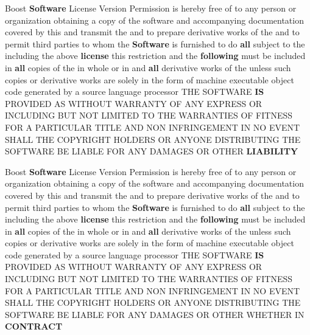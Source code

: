 \begin{DoxyCompactItemize}
\item 
Boost {\bf Software} License Version Permission is hereby free of to any person or organization obtaining a copy of the software and accompanying documentation covered by this and transmit the and to prepare derivative works of the and to permit third parties to whom the {\bf Software} is furnished to do {\bf all} subject to the including the above {\bf license} this restriction and the {\bf following} must be included in {\bf all} copies of the in whole or in and {\bf all} derivative works of the unless such copies or derivative works are solely in the form of machine executable object code generated by a source language processor T\+HE S\+O\+F\+T\+W\+A\+RE {\bf IS} P\+R\+O\+V\+I\+D\+ED AS W\+I\+T\+H\+O\+UT W\+A\+R\+R\+A\+N\+TY OF A\+NY E\+X\+P\+R\+E\+SS OR I\+N\+C\+L\+U\+D\+I\+NG B\+UT N\+OT L\+I\+M\+I\+T\+ED TO T\+HE W\+A\+R\+R\+A\+N\+T\+I\+ES OF F\+I\+T\+N\+E\+SS F\+OR A P\+A\+R\+T\+I\+C\+U\+L\+AR T\+I\+T\+LE A\+ND N\+ON I\+N\+F\+R\+I\+N\+G\+E\+M\+E\+NT IN NO E\+V\+E\+NT S\+H\+A\+LL T\+HE C\+O\+P\+Y\+R\+I\+G\+HT H\+O\+L\+D\+E\+RS OR A\+N\+Y\+O\+NE D\+I\+S\+T\+R\+I\+B\+U\+T\+I\+NG T\+HE S\+O\+F\+T\+W\+A\+RE BE L\+I\+A\+B\+LE F\+OR A\+NY D\+A\+M\+A\+G\+ES OR O\+T\+H\+ER {\bf L\+I\+A\+B\+I\+L\+I\+TY}
\item 
Boost {\bf Software} License Version Permission is hereby free of to any person or organization obtaining a copy of the software and accompanying documentation covered by this and transmit the and to prepare derivative works of the and to permit third parties to whom the {\bf Software} is furnished to do {\bf all} subject to the including the above {\bf license} this restriction and the {\bf following} must be included in {\bf all} copies of the in whole or in and {\bf all} derivative works of the unless such copies or derivative works are solely in the form of machine executable object code generated by a source language processor T\+HE S\+O\+F\+T\+W\+A\+RE {\bf IS} P\+R\+O\+V\+I\+D\+ED AS W\+I\+T\+H\+O\+UT W\+A\+R\+R\+A\+N\+TY OF A\+NY E\+X\+P\+R\+E\+SS OR I\+N\+C\+L\+U\+D\+I\+NG B\+UT N\+OT L\+I\+M\+I\+T\+ED TO T\+HE W\+A\+R\+R\+A\+N\+T\+I\+ES OF F\+I\+T\+N\+E\+SS F\+OR A P\+A\+R\+T\+I\+C\+U\+L\+AR T\+I\+T\+LE A\+ND N\+ON I\+N\+F\+R\+I\+N\+G\+E\+M\+E\+NT IN NO E\+V\+E\+NT S\+H\+A\+LL T\+HE C\+O\+P\+Y\+R\+I\+G\+HT H\+O\+L\+D\+E\+RS OR A\+N\+Y\+O\+NE D\+I\+S\+T\+R\+I\+B\+U\+T\+I\+NG T\+HE S\+O\+F\+T\+W\+A\+RE BE L\+I\+A\+B\+LE F\+OR A\+NY D\+A\+M\+A\+G\+ES OR O\+T\+H\+ER W\+H\+E\+T\+H\+ER IN {\bf C\+O\+N\+T\+R\+A\+CT}
\item 

\end{DoxyCompactItemize}
